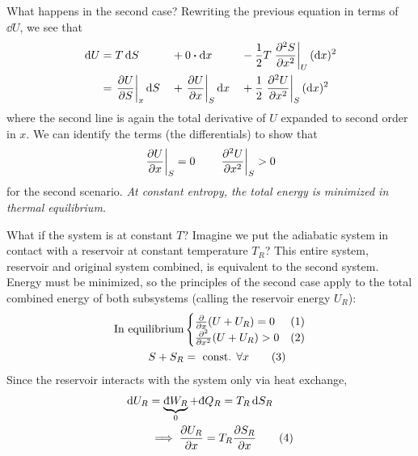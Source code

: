 \documentclass[a4paper,twoside,master.tex]{subfiles}
\begin{document}
What happens in the second case? Rewriting the previous equation in terms of $ \dd{U} $, we see that
\begin{alignat}{3}
    \dd{U} &= T \dd{S} &&+ 0 \vdot \dd{x} &&- \frac{1}{2} T \eval{\pdv[2]{S}{x}}_{U} (\dd{x})^2 \\
    &= \eval{\pdv{U}{S}}_{x} \dd{S} &&+ \eval{\pdv{U}{x}}_{S} \dd{x} &&+ \frac{1}{2} \eval{\pdv[2]{U}{x}}_{S} (\dd{x})^2
\end{alignat}
where the second line is again the total derivative of $ U $ expanded to second order in $ x $. We can identify the terms (the differentials) to show that
\begin{equation}
    \eval{\pdv{U}{x}}_{S} = 0 \qquad \eval{\pdv[2]{U}{x}}_{S} > 0
\end{equation}
for the second scenario. \textit{At constant entropy, the total energy is minimized in thermal equilibrium.}


What if the system is at constant $ T $? Imagine we put the adiabatic system in contact with a reservoir at constant temperature $ T_R $? This entire system, reservoir and original system combined, is equivalent to the second system. Energy must be minimized, so the principles of the second case apply to the total combined energy of both subsystems (calling the reservoir energy $ U_R $):
\begin{align}
    \text{In equilibrium} &\begin{cases} \pdv{x}(U + U_R) = 0 & (1)\\ \pdv[2]{x}(U + U_R) > 0 & (2)  \end{cases}\\
    S+S_R &= \text{ const. } \forall x \qquad (3)
\end{align}
Since the reservoir interacts with the system only via heat exchange,
\begin{align}
    \dd{U_R} &= \underbrace{\dbar{W_R}}_{0} + \dbar{Q_R} = T_R \dd{S_R} \\
    & \implies \pdv{U_R}{x} = T_R \pdv{S_R}{x} \qquad (4)
\end{align}
\end{document}
